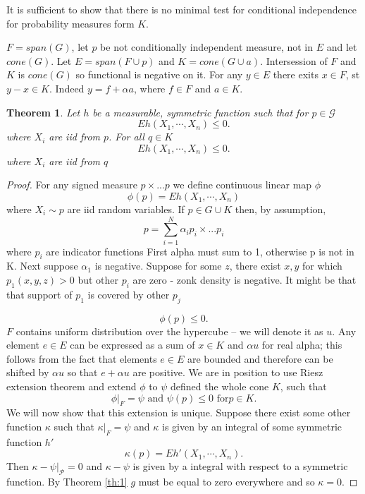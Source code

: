 \documentclass{article}
\newtheorem{Theorem}{Theorem}
\begin{document}
It is sufficient to show that there is no minimal test for conditional independence for probability measures form $K$. 

$F = span(G)$, let $p$ be not conditionally independent measure, not in $E$ and let $cone(G)$. 
Let $E = span(F \cup p)$ and $K= cone(G \cup a)$. Intersession of $F$ and $K$ is $cone(G)$ so functional is negative on it. 
For any $y \in E$ there exits $x \in F$, st $y-x \in K$.  Indeed $y = f + \alpha a$, where $f \in F$ and $a \in K$.





\begin{Theorem}
 Let $h$ be a measurable, symmetric function such that for $p \in \mathcal G$ 
 \[
 E h(X_1, \cdots , X_n) \leq 0.
\]
where $X_i$ are iid from $p$. For all $q \in K$
\[
 E h(X_1, \cdots , X_n) \leq 0.
\]
where $X_i$ are iid from $q$
\end{Theorem}

\begin{proof}
 
 For any signed measure  $p \times ... p$ we define continuous linear map $\phi$
 \[
  \phi(p) =  E h(X_1, \cdots , X_n)
 \]
where $X_i \sim p$ are iid random variables. If $p \in G \cup K$ then, by assumption,
\[
 p = \sum_{i=1}^N \alpha_i p_i \times ... p_i
\]
where $p_i$ are indicator functions 
First alpha must sum to 1, otherwise p is not in K. Next suppose $\alpha_1$ is negative. Suppose for some $z$, there exist $x,y$ for which 
$p_1(x,y,z) >0 $ but other $p_i$ are zero - zonk density is negative. It might be that that support of $p_1$ is covered by other $p_j$  



\[
  \phi(p) \leq 0.
\]
$F$ contains uniform distribution over the hypercube -- we will denote it as $u$. Any element  $e \in E$ can be expressed as a sum of $x \in K$ and $\alpha u$ for real alpha; this follows from the fact that elements  $ e \in E$ are bounded and therefore can be shifted by $\alpha u$ so that $e + \alpha u$ are positive. We are in position to use Riesz extension theorem and extend $\phi$ to $\psi$ defined the whole cone $K$, such that 
\[
 \phi |_{F} = \psi \text{ and } \psi(p) \leq 0 \text{ for} p \in K.
\]
We will now show that this extension is unique. Suppose there exist some other function $\kappa$ such that $\kappa |_{F} = \psi$ and $\kappa$ is given by an integral of some symmetric function $h'$
 \[
  \kappa(p) =  E h'(X_1, \cdots , X_n).
 \]
Then $\kappa - \psi |_{\mathcal{P}} = 0$ and $\kappa - \psi$ is given by a integral with respect to a symmetric function. By Theorem \ref{th:1} $g$ must be equal to zero everywhere and so $\kappa =0$.   
\end{proof}
\end{document}
